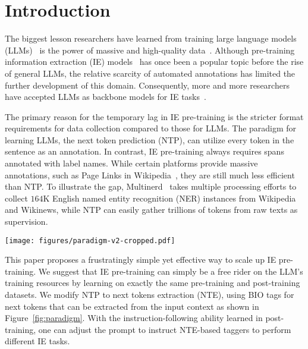 \section{Introduction}

The biggest lesson researchers have learned from training large language models (LLMs)~\citep{tulu,llama-2,achiam2023gpt4,olmo,dubey2024llama3,team2024gemma} is the power of massive and high-quality data~\citep{scaling_law,scaling_law_transfer}. Although pre-training information extraction (IE) models~\citep{pretrain_ner,multinerd,UIE,TadNER,NuNER,metaie} has once been a popular topic before the rise of general LLMs, the relative scarcity of automated annotations has limited the further development of this domain. Consequently, more and more researchers have accepted LLMs as backbone models for IE tasks~\citep{llm4clinicalie,gpt-ner,llm4ie}.

The primary reason for the temporary lag in IE pre-training is the stricter format requirements for data collection compared to those for LLMs.
The paradigm for learning LLMs, the next token prediction (NTP), can utilize every token in the sentence as an annotation. In contrast, IE pre-training always requires spans annotated with label names. 
While certain platforms provide massive annotations, such as Page Links in Wikipedia~\citep{ner_wiki,fewnerd,fewrel,multinerd}, they are still much less efficient than NTP. 
To illustrate the gap, Multinerd~\citep{multinerd} takes multiple processing efforts to collect $164$K English named entity recognition (NER) instances from Wikipedia and Wikinews, while NTP can easily gather trillions of tokens from raw texts as supervision. 

\begin{figure*}
    \centering
    \texttt{[image: figures/paradigm-v2-cropped.pdf]}
    \caption{\our takes a free ride on LLM resources (e.g., C4 and TuluV3~\citep{tulu3}) by formalizing next token prediction for duplicative spans as extraction in the BIO paradigm. During the inference, the prompts can be adjusted to different extractive tasks, making \our a versatile IE model.
    }
    \label{fig:paradigm}
    \vspace{-5mm}
\end{figure*}

This paper proposes a frustratingly simple yet effective way to scale up IE pre-training. We suggest that IE pre-training can simply be a free rider on the LLM's training resources by learning on exactly the same pre-training and post-training datasets. We modify NTP to next tokens extraction (NTE), using BIO tags for next tokens that can be extracted from the input context as shown in Figure~\ref{fig:paradigm}. With the instruction-following ability learned in post-training, one can adjust the prompt to instruct NTE-based taggers to perform different IE tasks.

